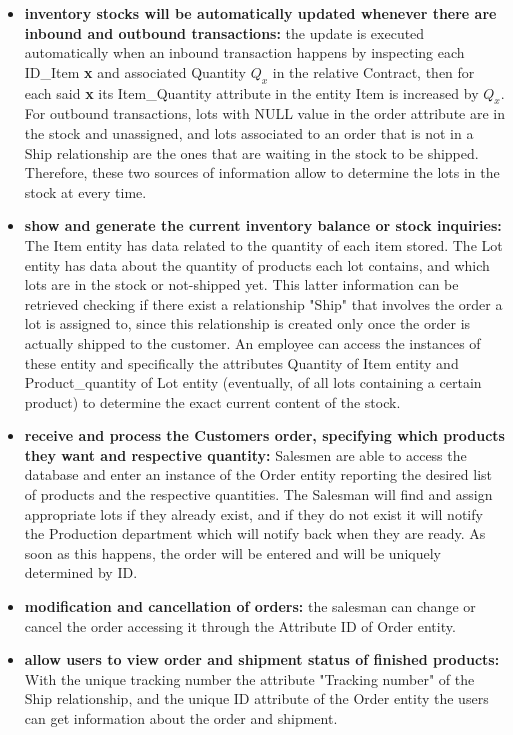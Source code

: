\begin{itemize}
    \item \textbf{inventory stocks will be automatically updated whenever there are inbound and outbound transactions:} the update is executed automatically when an inbound transaction happens by inspecting each ID\_Item \textbf{x} and associated Quantity \(Q_x\) in the relative Contract, then for each said \textbf{x} its Item\_Quantity attribute in the entity Item is increased by  \(Q_x\). For outbound transactions, lots with NULL value in the order attribute are in the stock and unassigned, and lots associated to an order that is not in a Ship relationship are the ones that are waiting in the stock to be shipped. Therefore, these two sources of information allow to determine the lots in the stock at every time.
    \item \textbf{show and generate the current inventory balance or stock inquiries:} The Item entity has data related to the quantity of each item stored. The Lot entity has data about the quantity of products each lot contains, and which lots are in the stock or not-shipped yet. This latter information can be retrieved checking if there exist a relationship "Ship" that involves the order a lot is assigned to, since this relationship is created only once the order is actually shipped to the customer. An employee can access the instances of these entity and specifically the attributes Quantity of Item entity and Product\_quantity of Lot entity (eventually, of all lots containing a certain product) to determine the exact current content of the stock.
    \item \textbf{receive and process the Customers order, specifying which products they want and respective quantity:} Salesmen are able to access the database and enter an instance of the Order entity reporting the desired list of products and the respective quantities. The Salesman will find and assign appropriate lots if they already exist, and if they do not exist it will notify the Production department which will notify back when they are ready. As soon as this happens, the order will be entered and will be uniquely determined by ID.
    \item \textbf{modification and cancellation of orders:} the salesman can change or cancel the order accessing it through the Attribute ID of Order entity.
    \item \textbf{allow users to view order and shipment status of finished products:} With the unique tracking number the attribute "Tracking number" of the Ship relationship, and the unique ID attribute of the Order entity the users can get information about the order and shipment.

\end{itemize}
